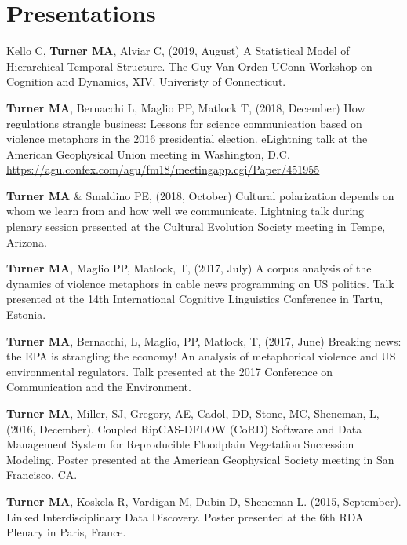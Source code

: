\documentclass[letterpaper,11pt,oneside]{article}
\begin{document}
\noindent

\section*{\textcolor{gunmetal}{Presentations}}

  \begin{hangparas}{0.25in}{1}
   Kello C, \textbf{Turner MA}, Alviar C, (2019, August) A Statistical Model of Hierarchical Temporal Structure. The Guy Van Orden UConn Workshop on Cognition and Dynamics, XIV. Univeristy of Connecticut.

\textbf{Turner MA}, Bernacchi L, Maglio PP, Matlock T, (2018, December) How regulations strangle business: Lessons for science communication based on violence metaphors in the 2016 presidential election. eLightning talk at the American Geophysical Union meeting in Washington, D.C. \url{https://agu.confex.com/agu/fm18/meetingapp.cgi/Paper/451955}

\textbf{Turner MA} \& Smaldino PE, (2018, October) Cultural polarization depends on whom we learn from and how well we communicate. Lightning talk during plenary session presented at the Cultural Evolution Society meeting in Tempe, Arizona.

\textbf{Turner MA}, Maglio PP, Matlock, T, (2017, July) A corpus analysis of the dynamics of violence metaphors in cable news programming on US politics. Talk presented at the 14th International Cognitive Linguistics Conference in Tartu, Estonia.

\textbf{Turner MA}, Bernacchi, L, Maglio, PP, Matlock, T, (2017, June) Breaking news: the EPA is strangling the economy! An analysis of metaphorical violence and US environmental regulators. Talk presented at the 2017 Conference on Communication and the Environment.

\textbf{Turner MA}, Miller, SJ, Gregory, AE, Cadol, DD, Stone, MC, Sheneman, L, (2016, December). Coupled RipCAS-DFLOW (CoRD) Software and Data Management System for Reproducible Floodplain Vegetation Succession Modeling. Poster presented at the American Geophysical Society meeting in San Francisco, CA.

\textbf{Turner MA}, Koskela R, Vardigan M, Dubin D, Sheneman L. (2015, September). Linked Interdisciplinary Data Discovery. Poster presented at the 6th RDA Plenary in Paris, France. 
  \end{hangparas}
\end{document}
